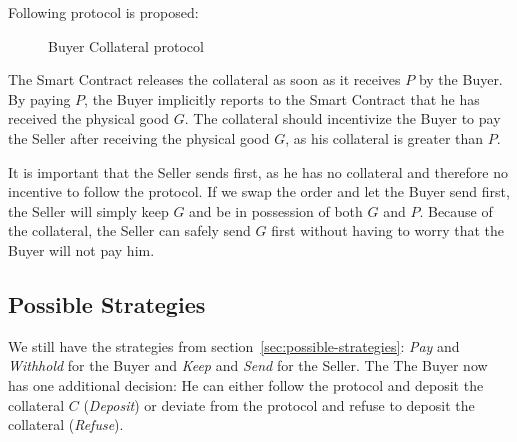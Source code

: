 \documentclass{cacthesis}
\begin{document}
Following protocol is proposed:
\begin{figure}[htb!]
    \centering
    \caption{Buyer Collateral protocol}
    \label{pro:buyer-col}
\end{figure}

The Smart Contract releases the collateral as soon as it receives $P$ by the Buyer. By paying $P$, the Buyer implicitly reports to the Smart Contract that he has received the physical good $G$. The collateral should incentivize the Buyer to pay the Seller after receiving the physical good $G$, as his collateral is greater than $P$.\newline

It is important that the Seller sends first, as he has no collateral and therefore no incentive to follow the protocol. If we swap the order and let the Buyer send first, the Seller will simply keep $G$ and be in possession of both $G$ and $P$. Because of the collateral, the Seller can safely send $G$ first without having to worry that the Buyer will not pay him.\newline

\subsection{Possible Strategies}
We still have the strategies from section~\ref{sec:possible-strategies}: \emph{Pay} and \emph{Withhold} for the Buyer and \emph{Keep} and \emph{Send} for the Seller. The The Buyer now has one additional decision: He can either follow the protocol and deposit the collateral $C$ (\emph{Deposit}) or deviate from the protocol and refuse to deposit the collateral (\emph{Refuse}).
\end{document}
